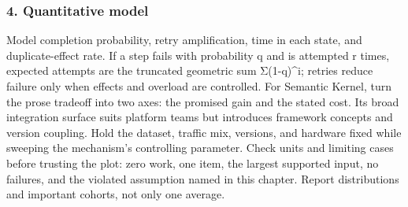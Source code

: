 \subsubsection*{4. Quantitative model}
Model completion probability, retry amplification, time in each state, and duplicate-effect rate. If a step fails with probability q and is attempted r times, expected attempts are the truncated geometric sum Σ(1-q)\textasciicircum{}i; retries reduce failure only when effects and overload are controlled.
For Semantic Kernel, turn the prose tradeoff into two axes: the promised gain and the stated cost. Its broad integration surface suits platform teams but introduces framework concepts and version coupling. Hold the dataset, traffic mix, versions, and hardware fixed while sweeping the mechanism's controlling parameter.
Check units and limiting cases before trusting the plot: zero work, one item, the largest supported input, no failures, and the violated assumption named in this chapter. Report distributions and important cohorts, not only one average.
